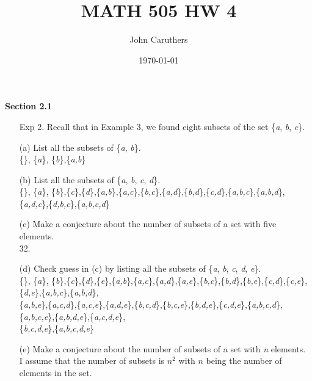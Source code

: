 \documentclass{article}
\title{MATH 505 HW 4}
\author{John Caruthers}
\date\today
\begin{document}
\maketitle

\textbf{Section 2.1}

\begin{itemize}
    \item[Exp 2.] Recall that in Example 3, we found eight subsets of the set \{\emph{a}, \emph{b}, \emph{c}\}.
    
    (a) List all the subsets of \{\emph{a}, \emph{b}\}.\\
    {\color{blue} \{\emph{}\}, \{\emph{a}\}, \{\emph{b}\},\{\emph{a,b}\}}
    
    (b) List all the subsets of \{\emph{a}, \emph{b}, \emph{c}, \emph{d}\}.\\
    {\color{blue} \{\emph{}\}, \{\emph{a}\}, \{\emph{b}\},\{\emph{c}\},\{\emph{d}\},\{\emph{a,b}\},\{\emph{a,c}\},\{\emph{b,c}\},\{\emph{a,d}\},\{\emph{b,d}\},\{\emph{c,d}\},\{\emph{a,b,c}\},\{\emph{a,b,d}\},\{\emph{a,d,c}\},\{\emph{d,b,c}\},\{\emph{a,b,c,d}\}}
    
    (c) Make a conjecture about the number of subsets of a set with five elements.\\
    {\color{blue} 32.}
    
    (d) Check guess in (c) by listing all the subsets of \{\emph{a}, \emph{b}, \emph{c}, \emph{d}, \emph{e}\}.\\
    {\color{blue} \{\emph{}\}, \{\emph{a}\}, \{\emph{b}\},\{\emph{c}\},\{\emph{d}\},\{\emph{e}\},\{\emph{a,b}\},\{\emph{a,c}\},\{\emph{a,d}\},\{\emph{a,e}\},\{\emph{b,c}\},\{\emph{b,d}\},\{\emph{b,e}\},\{\emph{c,d}\},\{\emph{c,e}\},\{\emph{d,e}\},\{\emph{a,b,c}\},\{\emph{a,b,d}\},\\\{\emph{a,b,e}\},\{\emph{a,c,d}\},\{\emph{a,c,e}\},\{\emph{a,d,e}\},\{\emph{b,c,d}\},\{\emph{b,c,e}\},\{\emph{b,d,e}\},\{\emph{c,d,e}\},\{\emph{a,b,c,d}\},\{\emph{a,b,c,e}\},\{\emph{a,b,d,e}\},\{\emph{a,c,d,e}\},\\\{\emph{b,c,d,e}\},\{\emph{a,b,c,d,e}\}}
    
    (e) Make a conjecture about the number of subsets of a set with \emph{n} elements.\\
    {\color{blue} I assume that the number of subsets is $n^2$ with $n$ being the number of elements in the set.}
    

\end{itemize}
\end{document}
